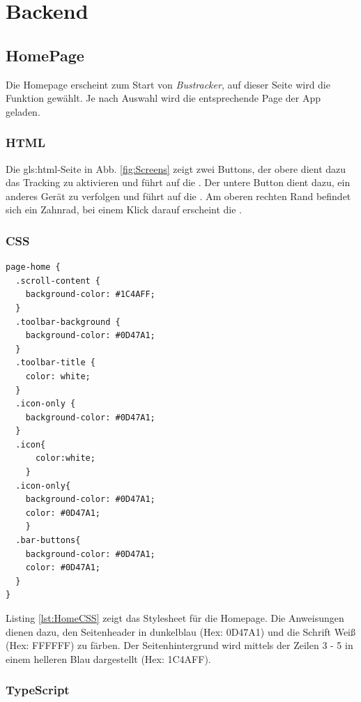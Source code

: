 \chapter{Backend}
\label{Backend}

\section{HomePage}
\label{HomePage}
Die Homepage erscheint zum Start von \emph{Bustracker}, auf dieser Seite wird die Funktion gewählt. Je nach Auswahl wird die entsprechende Page der App geladen.
\subsection{HTML}
Die \gls{gls:html}-Seite in Abb. \ref{fig:Screens} zeigt zwei Buttons, der obere dient dazu das Tracking zu aktivieren und führt auf die . 
Der untere Button dient dazu, ein anderes Gerät zu verfolgen und führt auf die .
Am oberen rechten Rand befindet sich ein \glqq Zahnrad\grqq, bei einem Klick darauf erscheint die .
\subsection{CSS}

\begin{lstlisting}[float, language=HTML5, caption=Stylesheet für die Homepage , label=lst:HomeCSS]
page-home {
  .scroll-content {
    background-color: #1C4AFF;
  }
  .toolbar-background {
    background-color: #0D47A1;
  }
  .toolbar-title {
    color: white;
  }
  .icon-only {
    background-color: #0D47A1;
  }
  .icon{
      color:white;
    }
  .icon-only{
    background-color: #0D47A1;
    color: #0D47A1;
    }
  .bar-buttons{
    background-color: #0D47A1;
    color: #0D47A1;
  }
}

\end{lstlisting}

Listing \ref{lst:HomeCSS} zeigt das Stylesheet für die Homepage. Die Anweisungen dienen dazu, den Seitenheader in dunkelblau (Hex: 0D47A1) und die Schrift Weiß (Hex: FFFFFF) zu färben.  Der Seitenhintergrund wird mittels der Zeilen 3 - 5 in einem helleren Blau dargestellt (Hex: 1C4AFF).

\subsection{TypeScript}

